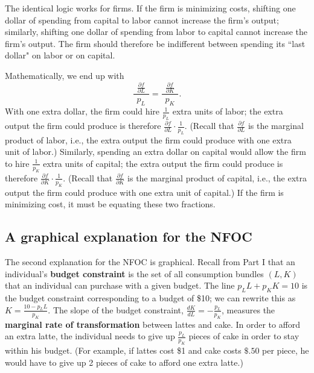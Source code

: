 The identical logic works for firms. If the firm is minimizing costs, shifting one dollar of spending from capital to labor cannot increase the firm's output; similarly, shifting one dollar of spending from labor to capital cannot increase the firm's output. The firm should therefore be indifferent between spending its ``last dollar" on labor or on capital.

Mathematically, we end up with
\[
\frac{\ \ \frac{\partial f}{\partial L}\ \ }{p_L}=\frac{\ \
\frac{\partial f}{\partial K}\ \ }{p_K}.
\]
With one extra dollar, the firm could hire $\displaystyle\frac{1}{p_L}$ extra units of labor; the extra output the firm could produce is therefore $\displaystyle\frac{\partial f}{\partial L}\cdot\frac{1}{p_L}$. (Recall that $\frac{\partial f}{\partial L}$ is the marginal product of labor, i.e., the extra output the firm could produce with one extra unit of labor.) Similarly, spending an extra dollar on capital would allow the firm to hire $\displaystyle\frac{1}{p_K}$ extra units of capital; the extra output the firm could produce is therefore $\displaystyle\frac{\partial f}{\partial K}\cdot\frac{1}{p_K}$. (Recall that $\frac{\partial f}{\partial K}$ is the marginal product of capital, i.e., the extra output the firm could produce with one extra unit of capital.) If the firm is minimizing cost, it must be equating these two fractions.


\subsection*{A graphical explanation for the NFOC}

The second explanation for the NFOC is graphical. Recall from Part I that an individual's \textbf{budget constraint} is the set of all consumption bundles $(L, K)$ that an individual can purchase with a given budget. The line $p_L L + p_K K=10$ is the budget constraint corresponding to a budget of \$10; we can rewrite this as $\displaystyle K=\frac{10-p_L L}{p_K}$. The slope of the budget constraint, $\displaystyle \frac{dK}{dL}=-\frac{p_L}{p_K}$, measures the \textbf{marginal rate of transformation} between lattes and cake. In order to afford an extra latte, the individual needs to give up $\displaystyle\frac{p_L}{p_K}$ pieces of cake in order to stay within his budget. (For example, if lattes cost \$1 and cake costs $\$.50$ per piece, he would have to give up 2 pieces of cake to afford one extra latte.)

